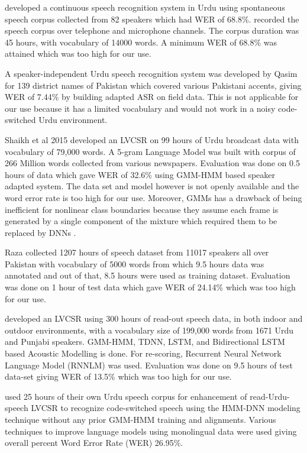 \cite{sarfraz_large_2010} developed a continuous speech recognition system in Urdu using spontaneous speech corpus collected from 82 speakers which had WER of 68.8\%. \cite{sarfraz_huda_speech_2016} recorded the speech corpus over telephone and microphone channels. The corpus duration was 45 hours, with vocabulary of 14000 words. A minimum WER of 68.8\% was attained which was too high for our use.

A speaker-independent Urdu speech recognition system was developed by Qasim \cite{qasim_urdu_2016} for 139 district names of Pakistan which covered various Pakistani accents, giving WER of 7.44\% by building adapted ASR on field data. This is not applicable for our use because it has a limited vocabulary and would not work in a noisy code-switched Urdu environment. 

Shaikh et al 2015 \cite{shaik_improvements_2015} developed an LVCSR on 99 hours of Urdu broadcast data with vocabulary of 79,000 words. A 5-gram Language Model was built with corpus of 266 Million words collected from various newspapers. Evaluation was done on 0.5 hours of data which gave WER of 32.6\% using GMM-HMM based speaker adapted system. The data set and model however is not openly available and the word error rate is too high for our use. Moreover, GMMs has a drawback of being inefficient for nonlinear class boundaries because they assume each frame is generated by a single component of the mixture which required them to be replaced by DNNs \cite{dahl_context-dependent_2012}.

Raza \cite{raza_rapid_2018} collected 1207 hours of speech dataset from 11017 speakers all over Pakistan with vocabulary of 5000 words from which 9.5 hours data was annotated and out of that, 8.5 hours were used as training dataset. Evaluation was done on 1 hour of test data which gave WER of 24.14\% which was too high for our use. 

\cite{farooq_improving_2019} developed an LVCSR using 300 hours of read-out speech data, in both indoor and outdoor environments, with a vocabulary size of 199,000 words from 1671 Urdu and Punjabi speakers. GMM-HMM, TDNN, LSTM, and Bidirectional  LSTM based Acoustic Modelling is done. For re-scoring, Recurrent Neural Network Language Model (RNNLM) was used. Evaluation was done on 9.5 hours of test data-set giving WER of 13.5\% which was too high for our use.

\cite{farooq_enhancing_2020} used 25 hours of their own Urdu speech corpus for enhancement of read-Urdu-speech LVCSR to recognize code-switched speech using the HMM-DNN modeling technique without any prior GMM-HMM training and alignments. Various techniques to improve language models using monolingual data were used giving overall percent Word Error Rate (WER) 26.95\%.

